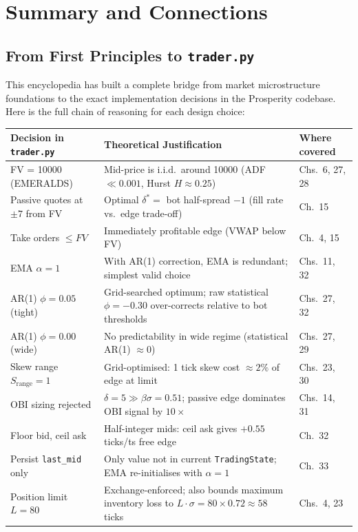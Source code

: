 \documentclass[12pt,a4paper,openany]{report}
\theoremstyle{definition}
\begin{document}

\chapter{Summary and Connections}

\section{From First Principles to \texttt{trader.py}}

This encyclopedia has built a complete bridge from market microstructure foundations to the exact implementation decisions in the Prosperity codebase. Here is the full chain of reasoning for each design choice:

\begin{center}
\begin{longtable}{p{4cm}p{5.5cm}p{4.5cm}}
\toprule
\textbf{Decision in \texttt{trader.py}} & \textbf{Theoretical Justification} & \textbf{Where covered} \\
\midrule
FV = 10000 (EMERALDS) & Mid-price is i.i.d.\ around 10000 (ADF $\ll 0.001$, Hurst $H \approx 0.25$) & Chs.\ 6, 27, 28 \\
Passive quotes at $\pm 7$ from FV & Optimal $\delta^* = $ bot half-spread $- 1$ (fill rate vs.\ edge trade-off) & Ch.\ 15 \\
Take orders $\leq FV$ & Immediately profitable edge (VWAP below FV) & Ch.\ 4, 15 \\
EMA $\alpha = 1$ & With AR(1) correction, EMA is redundant; simplest valid choice & Chs.\ 11, 32 \\
AR(1) $\phi = 0.05$ (tight) & Grid-searched optimum; raw statistical $\phi = -0.30$ over-corrects relative to bot thresholds & Chs.\ 27, 32 \\
AR(1) $\phi = 0.00$ (wide) & No predictability in wide regime (statistical AR(1) $\approx 0$) & Chs.\ 27, 29 \\
Skew range $S_{\text{range}} = 1$ & Grid-optimised: 1 tick skew cost $\approx 2\%$ of edge at limit & Chs.\ 23, 30 \\
OBI sizing rejected & $\delta = 5 \gg \beta\sigma = 0.51$; passive edge dominates OBI signal by $10\times$ & Chs.\ 14, 31 \\
Floor bid, ceil ask & Half-integer mids: ceil ask gives $+0.55$ ticks/ts free edge & Ch.\ 32 \\
Persist \texttt{last\_mid} only & Only value not in current \texttt{TradingState}; EMA re-initialises with $\alpha=1$ & Ch.\ 33 \\
Position limit $L = 80$ & Exchange-enforced; also bounds maximum inventory loss to $L \cdot \sigma = 80 \times 0.72 \approx 58$ ticks & Chs.\ 4, 23 \\
\bottomrule
\end{longtable}
\end{center}
\end{document}
